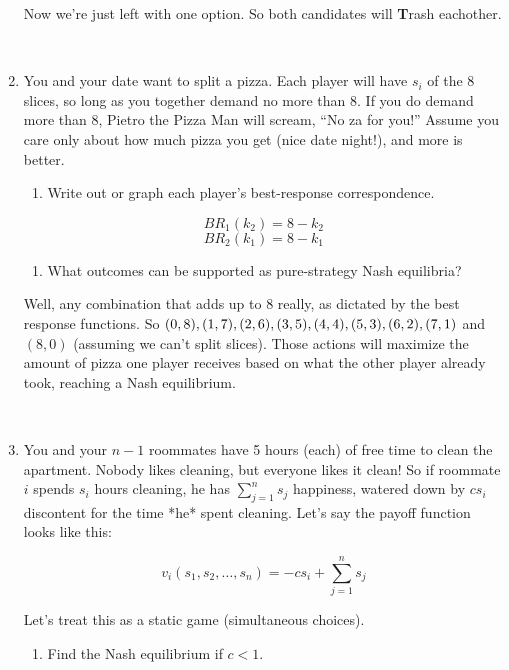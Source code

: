 \documentclass{article}
\begin{document}
\begin{enumerate}
          Now we're just left with one option. So both candidates will \textbf{T}rash eachother.

          \,

    \item You and your date want to split a pizza. Each player will have $s_i$ of the 8 slices, so long as you together demand no more than 8. If you do demand more than 8, Pietro the Pizza Man will scream, “No za for you!” Assume you care only about how much pizza you get (nice date night!), and more is better.

          \begin{enumerate}[label=(\alph*)]
              \item Write out or graph each player's best-response correspondence.
          \end{enumerate}

          \[BR_1(k_2) = 8 - k_2\]
          \[BR_2(k_1) = 8 - k_1\]

          \begin{enumerate}[resume]
              \item What outcomes can be supported as pure-strategy Nash equilibria?
          \end{enumerate}

          Well, any combination that adds up to 8 really, as dictated by the best response functions. So $(0, 8), (1, 7), (2, 6), \\ (3, 5), (4, 4), (5, 3), (6, 2), (7, 1)$ and $(8, 0)$ (assuming we can't split slices). Those actions will maximize the amount of pizza one player receives based on what the other player already took, reaching a Nash equilibrium.

          \,

    \item You and your $n - 1$ roommates have 5 hours (each) of free time to clean the apartment. Nobody likes cleaning, but everyone likes it clean! So if roommate $i$ spends $s_i$ hours cleaning, he has $\sum_{j=1}^{n} s_j$ happiness, watered down by $cs_i$ discontent for the time *he* spent cleaning. Let's say the payoff function looks like this:

          \[v_i(s_1, s_2, \dots, s_n) = -cs_i + \sum_{j=1}^{n} s_j\]

          Let's treat this as a static game (simultaneous choices).

          \begin{enumerate}[label=(\alph*)]
              \item Find the Nash equilibrium if $c < 1$.
          \end{enumerate}


\end{enumerate}
\end{document}
